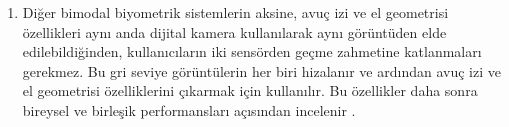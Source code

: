\documentclass[12pt, a4paper]{article}
\begin{document}
\begin{enumerate}
\begin{enumerate}
	\end{enumerate}
	\cite{ergen2011biyometrik}.

	\item  Diğer bimodal biyometrik sistemlerin aksine, avuç izi ve el geometrisi özellikleri aynı anda dijital kamera kullanılarak aynı görüntüden elde edilebildiğinden, kullanıcıların iki sensörden geçme zahmetine katlanmaları gerekmez. Bu gri seviye görüntülerin her biri hizalanır ve ardından avuç izi ve el geometrisi özelliklerini çıkarmak için kullanılır. Bu özellikler daha sonra bireysel ve birleşik performansları açısından incelenir \cite{kumar2003personal}.

\end{enumerate}
	
	

 	
\end{document}
